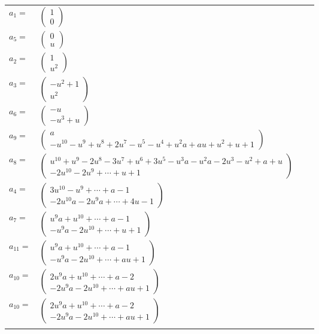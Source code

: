 \documentclass[1p]{elsarticle_modified}
\theoremstyle{definition}
\begin{document}
\begin{tabular}{m{7pt} m{180pt} m{7pt} m{180pt} }
\flushright $a_{1}=$&$\begin{pmatrix}1\\0\end{pmatrix}$ \\
\flushright $a_{5}=$&$\begin{pmatrix}0\\u\end{pmatrix}$ \\
\flushright $a_{2}=$&$\begin{pmatrix}1\\u^2\end{pmatrix}$ \\
\flushright $a_{3}=$&$\begin{pmatrix}- u^2+1\\u^2\end{pmatrix}$ \\
\flushright $a_{6}=$&$\begin{pmatrix}- u\\- u^3+u\end{pmatrix}$ \\
\flushright $a_{9}=$&$\begin{pmatrix}a\\- u^{10}- u^9+u^8+2 u^7- u^5- u^4+u^2 a+a u+u^2+u+1\end{pmatrix}$ \\
\flushright $a_{8}=$&$\begin{pmatrix}u^{10}+u^9-2 u^8-3 u^7+u^6+3 u^5- u^3 a- u^2 a-2 u^3- u^2+a+u\\-2 u^{10}-2 u^9+\cdots+u+1\end{pmatrix}$ \\
\flushright $a_{4}=$&$\begin{pmatrix}3 u^{10}- u^9+\cdots+a-1\\-2 u^{10} a-2 u^9 a+\cdots+4 u-1\end{pmatrix}$ \\
\flushright $a_{7}=$&$\begin{pmatrix}u^9 a+u^{10}+\cdots+a-1\\- u^9 a-2 u^{10}+\cdots+u+1\end{pmatrix}$ \\
\flushright $a_{11}=$&$\begin{pmatrix}u^9 a+u^{10}+\cdots+a-1\\- u^9 a-2 u^{10}+\cdots+a u+1\end{pmatrix}$ \\
\flushright $a_{10}=$&$\begin{pmatrix}2 u^9 a+u^{10}+\cdots+a-2\\-2 u^9 a-2 u^{10}+\cdots+a u+1\end{pmatrix}$\\ \flushright $a_{10}=$&$\begin{pmatrix}2 u^9 a+u^{10}+\cdots+a-2\\-2 u^9 a-2 u^{10}+\cdots+a u+1\end{pmatrix}$\\&\end{tabular}
\end{document}
